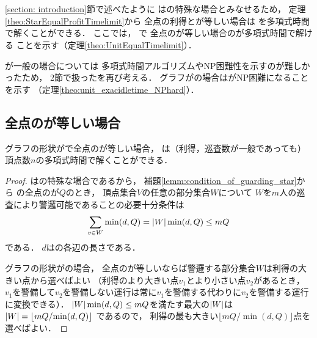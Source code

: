 \section{{\graphUnit}}
\label{section: unit}

\ref{section: introduction}節で述べたように
{\graphUnit}は{\graphStar}の特殊な場合とみなせるため，
定理\ref{theo:StarEqualProfitTimelimit}から
全点の利得と{\maxIdletime}が等しい場合は
{\patProb}を多項式時間で解くことができる．
ここでは，
{\graphUnit}で
全点の{\maxIdletime}が等しい場合の{\patProb}が多項式時間で解ける
ことを示す（定理\ref{theo:UnitEqualTimelimit}）．

{\maxIdletime}が一般の場合については
多項式時間アルゴリズムやNP困難性を示すのが難しかったため，
2節で扱った{\timeSpecifiedPatProb}を再び考える．
グラフが{\graphUnit}の場合は{\timeSpecifiedPatProb}がNP困難になることを示す
（定理\ref{theo:unit_exacidletime_NPhard}）．



\subsection{全点の{\maxIdletime}が等しい場合}

\begin{theo}
\label{theo:UnitEqualTimelimit}
グラフの形状が{\graphUnit}で全点の{\maxIdletime}が等しい場合，
{\patProb}は（利得，巡査数が一般であっても）
頂点数$n$の多項式時間で解くことができる．
\end{theo}
\begin{proof}
{\graphUnit}は{\graphStar}の特殊な場合であるから，
補題\ref{lemm:condition_of_guarding_star}から
{\graphUnit}の全点の{\maxIdletime}が$Q$のとき，
頂点集合$V$の任意の部分集合$W$について
$W$を$m$人の巡査により警邏可能であることの必要十分条件は
\[
  \sum_{v \in W} \min(d, Q) = \lvert{W}\rvert\min(d, Q) \leq mQ
\]
である．
$d$は{\graphUnit}の各辺の長さである．

グラフの形状が{\graphUnit}の場合，
全点の{\maxIdletime}が等しいならば警邏する部分集合$W$は利得の大きい点から選べばよい
（利得のより大きい点$v_1$とより小さい点$v_2$があるとき，
$v_1$を警備して$v_2$を警備しない運行は常に$v_1$を警備する代わりに$v_2$を警備する運行に変換できる）．
$\lvert{W}\rvert\min(d, Q) \leq mQ$を満たす最大の$\lvert{W}\rvert$は
$\lvert{W}\rvert = \left\lfloor {mQ}/{\min(d, Q)} \right\rfloor$
であるので，
利得の最も大きい$\lfloor {mQ}/{\min(d, Q)} \rfloor$点を選べばよい．
\end{proof}




